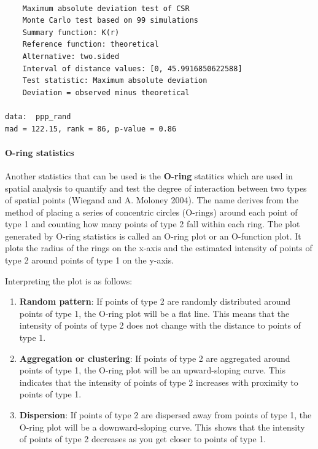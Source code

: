\documentclass[
  letterpaper,
]{book}
\let\oldparagraph\paragraph
\renewcommand{\paragraph}[1]{\oldparagraph{#1}\mbox{}}
\begin{document}
\begin{verbatim}

    Maximum absolute deviation test of CSR
    Monte Carlo test based on 99 simulations
    Summary function: K(r)
    Reference function: theoretical
    Alternative: two.sided
    Interval of distance values: [0, 45.9916850622588]
    Test statistic: Maximum absolute deviation
    Deviation = observed minus theoretical

data:  ppp_rand
mad = 122.15, rank = 86, p-value = 0.86
\end{verbatim}

\hypertarget{o-ring-statistics}{%
\paragraph{O-ring statistics}\label{o-ring-statistics}}

Another statistics that can be used is the \textbf{O-ring} statitics
which are used in spatial analysis to quantify and test the degree of
interaction between two types of spatial points (Wiegand and A. Moloney
2004). The name derives from the method of placing a series of
concentric circles (O-rings) around each point of type 1 and counting
how many points of type 2 fall within each ring. The plot generated by
O-ring statistics is called an O-ring plot or an O-function plot. It
plots the radius of the rings on the x-axis and the estimated intensity
of points of type 2 around points of type 1 on the y-axis.

Interpreting the plot is as follows:

\begin{enumerate}
\def\labelenumi{\arabic{enumi}.}
\item
  \textbf{Random pattern}: If points of type 2 are randomly distributed
  around points of type 1, the O-ring plot will be a flat line. This
  means that the intensity of points of type 2 does not change with the
  distance to points of type 1.
\item
  \textbf{Aggregation or clustering}: If points of type 2 are aggregated
  around points of type 1, the O-ring plot will be an upward-sloping
  curve. This indicates that the intensity of points of type 2 increases
  with proximity to points of type 1.
\item
  \textbf{Dispersion}: If points of type 2 are dispersed away from
  points of type 1, the O-ring plot will be a downward-sloping curve.
  This shows that the intensity of points of type 2 decreases as you get
  closer to points of type 1.
\end{enumerate}
\end{document}
